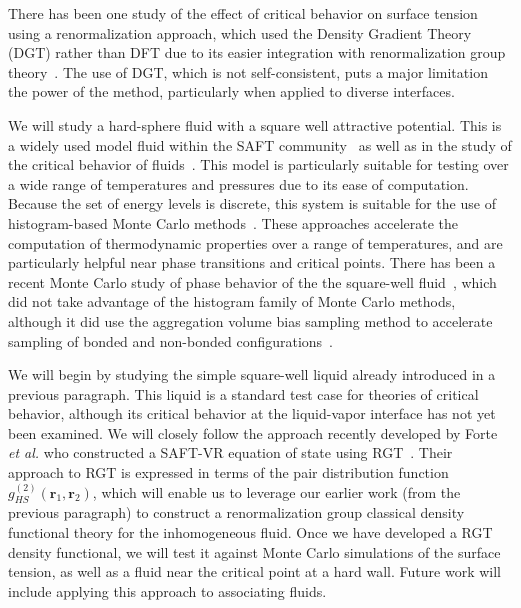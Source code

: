\documentclass[letterpaper,twocolumn,amsmath,amssymb,pre,aps,10pt]{revtex4-1}
\newcommand{\rr}{\mathbf{r}}
\begin{document}
There has been one study of the effect of critical behavior on surface
tension using a renormalization approach, which used the Density
Gradient Theory (DGT) rather than DFT due to its easier integration
with renormalization group theory~\cite{fu2006study}.  The use of DGT,
which is not self-consistent, puts a major limitation the power of the
method, particularly when applied to diverse interfaces.


We will study a hard-sphere fluid with a square well attractive
potential.  This is a widely used model fluid within the SAFT
community~\cite{mi2004renormalization, mi2004improved, fu2006study,
  forte2011application} as well as in the study of the critical
behavior of fluids~\cite{white2000global, white2001global,
  del2002vapour, kiselev2002computer, reiner2002hierarchical,
  mi2004renormalization, mi2004improved, fu2006study,
  giacometti2009liquid, jiuxun2005simple, forte2011application,
  el2008integral, ramana2012generalized}. This model is particularly
suitable for testing over a wide range of temperatures and pressures
due to its ease of computation.  Because the set of energy levels is
discrete, this system is suitable for the use of histogram-based Monte
Carlo methods~\cite{ferrenberg1988histogram, lee1993new, de1998broad}.
These approaches accelerate the computation of thermodynamic
properties over a range of temperatures, and are particularly helpful
near phase transitions and critical points.  There has been a recent
Monte Carlo study of phase behavior of the the square-well
fluid~\cite{liu2005direct}, which did not take advantage of the
histogram family of Monte Carlo methods, although it did use the
aggregation volume bias sampling method to accelerate sampling of
bonded and non-bonded configurations~\cite{chen2000novel}.

We will begin by studying the simple square-well liquid already
introduced in a previous paragraph.  This liquid is a standard test
case for theories of critical behavior, although its critical behavior
at the liquid-vapor interface has not yet been examined.  We will
closely follow the approach recently developed by Forte \emph{et al.}
who constructed a SAFT-VR equation of state using
RGT~\cite{forte2011application}.  Their approach to RGT is expressed
in terms of the pair distribution function
$g^{(2)}_{HS}(\rr_1,\rr_2)$, which will enable us to leverage our
earlier work (from the previous paragraph) to construct a
renormalization group classical density functional theory for the
inhomogeneous fluid.  Once we have developed a RGT density functional,
we will test it against Monte Carlo simulations of the surface
tension, as well as a fluid near the critical point at a hard wall.
%
Future work will include applying this approach to associating fluids.
\end{document}
